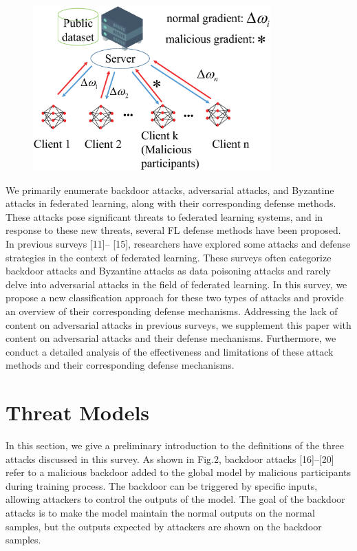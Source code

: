 \begin{figure}[t]
    \centering
    \includegraphics[width=1.0\linewidth,height=2.5in]{output/fig3.eps}
     \caption{}
     \label{fig3}
\end{figure}


We primarily enumerate backdoor attacks, adversarial
attacks, and Byzantine attacks in federated learning, along
with their corresponding defense methods. These attacks
pose significant threats to federated learning systems,
and in response to these new threats, several FL defense
methods have been proposed. In previous surveys [11]–
[15], researchers have explored some attacks and defense
strategies in the context of federated learning. These
surveys often categorize backdoor attacks and Byzantine
attacks as data poisoning attacks and rarely delve into
adversarial attacks in the field of federated learning. In
this survey, we propose a new classification approach for
these two types of attacks and provide an overview of their
corresponding defense mechanisms. Addressing the lack
of content on adversarial attacks in previous surveys, we
supplement this paper with content on adversarial attacks
and their defense mechanisms. Furthermore, we conduct
a detailed analysis of the effectiveness and limitations
of these attack methods and their corresponding defense
mechanisms.

\section{Threat Models} 
In this section, we give a preliminary introduction to the
definitions of the three attacks discussed in this survey.
As shown in Fig.2, backdoor attacks [16]–[20] refer to a
malicious backdoor added to the global model by malicious
participants during training process. The backdoor can be
triggered by specific inputs, allowing attackers to control
the outputs of the model. The goal of the backdoor attacks
is to make the model maintain the normal outputs on the normal samples, but the outputs expected by attackers
are shown on the backdoor samples. 

